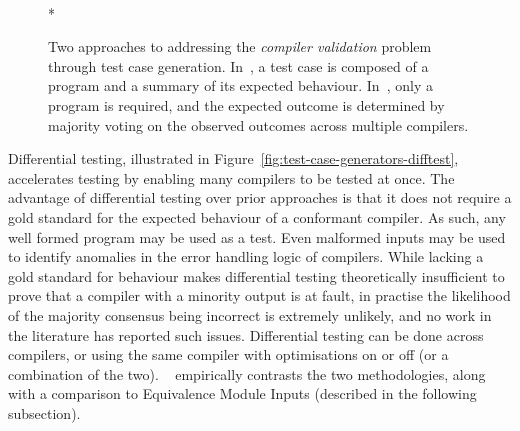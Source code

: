 \begin{figure}
  \centering
  \\*
  \caption[Generating and evaluating compiler test cases]{%
    Two approaches to addressing the \emph{compiler validation} problem through test case generation. In~\protect{}, a test case is composed of a program and a summary of its expected behaviour. In~\protect{}, only a program is required, and the expected outcome is determined by majority voting on the observed outcomes across multiple compilers.%
  }%
  \label{fig:test-case-generators}
\end{figure}

Differential testing, illustrated in Figure~\ref{fig:test-case-generators-difftest}, accelerates testing by enabling many compilers to be tested at once. The advantage of differential testing over prior approaches is that it does not require a gold standard for the expected behaviour of a conformant compiler. As such, any well formed program may be used as a test. Even malformed inputs may be used to identify anomalies in the error handling logic of compilers. While lacking a gold standard for behaviour makes differential testing theoretically insufficient to prove that a compiler with a minority output is at fault, in practise the likelihood of the majority consensus being incorrect is extremely unlikely, and no work in the literature has reported such issues. Differential testing can be done across compilers, or using the same compiler with optimisations on or off (or a combination of the two). \citeauthor{Chen2014a}~\cite{Chen2014a} empirically contrasts the two methodologies, along with a comparison to Equivalence Module Inputs (described in the following subsection).

